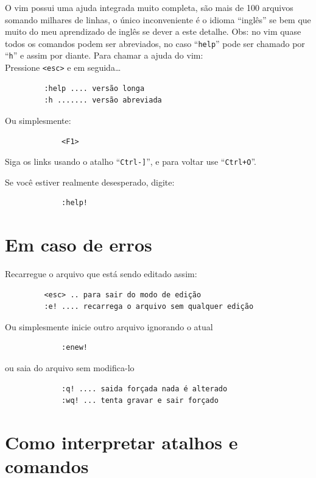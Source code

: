 \documentclass[10pt,a4paper,openany]{book}
\begin{document}
O vim possui uma ajuda integrada muito completa, são mais de 100 arquivos
somando milhares de linhas, o único inconveniente é o idioma ``inglês'' se bem
que muito do meu aprendizado de inglês se dever a este detalhe.
Obs: no vim quase todos os comandos podem ser abreviados, no caso
``\verb+help+'' pode ser chamado por ``\verb+h+'' e assim por diante.
Para chamar a ajuda do vim:  \\

Pressione \verb|<esc>| e em seguida\dots

\begin{verbatim}
		 :help .... versão longa
		 :h ....... versão abreviada
\end{verbatim}

Ou simplesmente:

\begin{verbatim}
			 <F1>
\end{verbatim}

Siga os links usando o atalho ``\verb+Ctrl-]+'', e para voltar use
  ``\verb|Ctrl+O|''.

Se você estiver realmente desesperado, digite:

\begin{verbatim}
			 :help!
\end{verbatim}



\section{Em caso de erros }\label{Em caso de erros }
Recarregue o arquivo que está sendo editado assim:

\begin{verbatim}
		 <esc> .. para sair do modo de edição
		 :e! .... recarrega o arquivo sem qualquer edição
\end{verbatim}

Ou simplesmente inicie outro arquivo ignorando o atual

\begin{verbatim}
			 :enew!
\end{verbatim}

ou saia do arquivo sem modifica-lo

\begin{verbatim}
			 :q! .... saida forçada nada é alterado
			 :wq! ... tenta gravar e sair forçado
\end{verbatim}

\section{Como interpretar atalhos e comandos}\label{Como interpretar atalhos e comandos}
\end{document}
